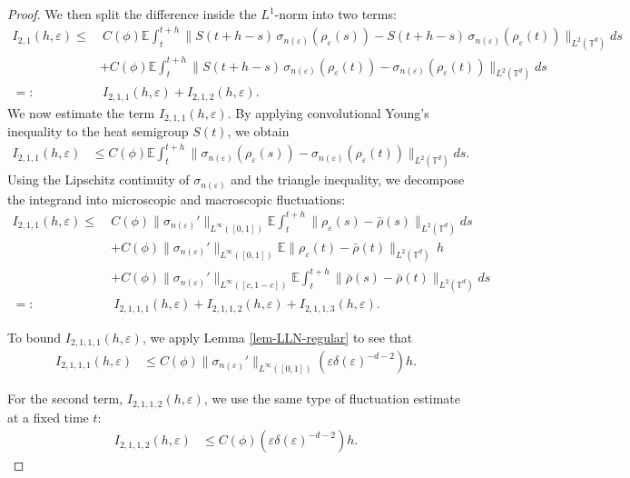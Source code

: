 \documentclass[10pt,a4paper]{amsart}
\def\leq{\leqslant}
\begin{document}
\begin{proof}
We then split the difference inside the $L^1$-norm into two terms:
\begin{align*}
I_{2,1}(h,\varepsilon) 
\leq&\ C(\phi) \mathbb{E} \int_t^{t+h} \| S(t+h - s)\, \sigma_{n(\varepsilon)}(\rho_{\varepsilon}(s)) 
- S(t+h - s)\, \sigma_{n(\varepsilon)}(\rho_{\varepsilon}(t)) \|_{L^2(\mathbb{T}^d)} ds \\
&+ C(\phi) \mathbb{E} \int_t^{t+h} \| S(t+h - s)\, \sigma_{n(\varepsilon)}(\rho_{\varepsilon}(t)) 
- \sigma_{n(\varepsilon)}(\rho_{\varepsilon}(t)) \|_{L^2(\mathbb{T}^d)} ds \\
=:&\ I_{2,1,1}(h,\varepsilon) + I_{2,1,2}(h,\varepsilon).
\end{align*}
We now estimate the term $I_{2,1,1}(h,\varepsilon)$. By applying convolutional Young's inequality to the heat semigroup $S(t)$, we obtain
\begin{align*}
I_{2,1,1}(h,\varepsilon) 
&\leq C(\phi) \mathbb{E} \int_t^{t+h} \| \sigma_{n(\varepsilon)}(\rho_{\varepsilon}(s)) - \sigma_{n(\varepsilon)}(\rho_{\varepsilon}(t)) \|_{L^2(\mathbb{T}^d)} ds.
\end{align*}
Using the Lipschitz continuity of $\sigma_{n(\varepsilon)}$ and the triangle inequality, we decompose the integrand into microscopic and macroscopic fluctuations:
\begin{align*}
I_{2,1,1}(h,\varepsilon) 
\leq\ & C(\phi) \| \sigma_{n(\varepsilon)}' \|_{L^{\infty}([0,1])} \mathbb{E} \int_t^{t+h} \| \rho_{\varepsilon}(s) - \bar{\rho}(s) \|_{L^2(\mathbb{T}^d)} ds \\
& + C(\phi) \| \sigma_{n(\varepsilon)}' \|_{L^{\infty}([0,1])} \mathbb{E} \| \rho_{\varepsilon}(t) - \bar{\rho}(t) \|_{L^2(\mathbb{T}^d)}\, h \\
& + C(\phi) \| \sigma_{n(\varepsilon)}' \|_{L^{\infty}([c,1-c])} \mathbb{E} \int_t^{t+h} \| \bar{\rho}(s) - \bar{\rho}(t) \|_{L^2(\mathbb{T}^d)} ds \\
=:&\ I_{2,1,1,1}(h,\varepsilon) + I_{2,1,1,2}(h,\varepsilon) + I_{2,1,1,3}(h,\varepsilon).
\end{align*}

To bound $I_{2,1,1,1}(h,\varepsilon)$, we apply Lemma \ref{lem-LLN-regular} to see that 
\begin{align*}
I_{2,1,1,1}(h,\varepsilon) 
&\leq C(\phi) \| \sigma_{n(\varepsilon)}' \|_{L^{\infty}([0,1])} 
\left( \varepsilon \delta(\varepsilon)^{-d-2} \right) h.
\end{align*}

For the second term, $I_{2,1,1,2}(h,\varepsilon)$, we use the same type of fluctuation estimate at a fixed time $t$:
\begin{align*}
I_{2,1,1,2}(h,\varepsilon) 
&\leq C(\phi) \left( \varepsilon \delta(\varepsilon)^{-d-2} \right) h.
\end{align*}


\end{proof}
\end{document}
